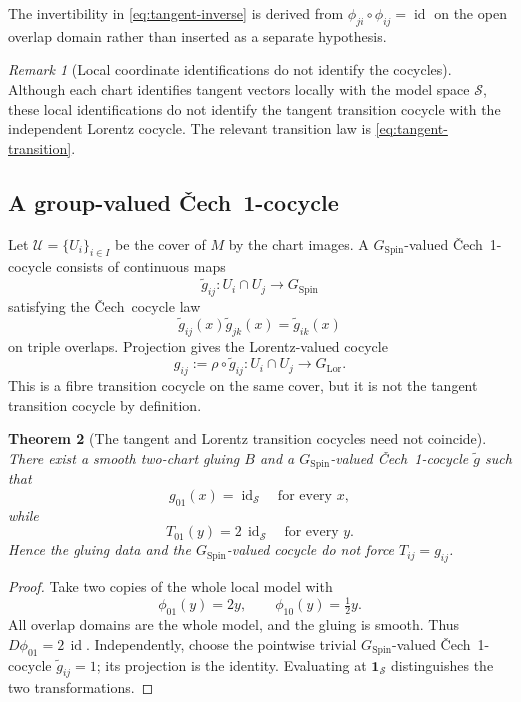 \documentclass[11pt,a4paper]{article}
\newtheorem{theorem}{Theorem}[section]
\theoremstyle{definition}
\theoremstyle{remark}
\newtheorem{remark}[theorem]{Remark}
\newcommand{\Smodel}{\mathcal{S}}
\newcommand{\SpinG}{G_{\mathrm{Spin}}}
\newcommand{\LorG}{G_{\mathrm{Lor}}}
\newcommand{\id}{\operatorname{id}}
\newcommand{\Cech}{\ifmmode\text{\v{C}ech}\else\v{C}ech\fi}
\newcommand{\cU}{\mathcal{U}}
\begin{document}
The invertibility in \eqref{eq:tangent-inverse} is derived from
\(\phi_{ji}\circ\phi_{ij}=\id\) on the open overlap domain rather than
inserted as a separate hypothesis.

\begin{remark}[Local coordinate identifications do not identify the cocycles]
Although each chart identifies tangent vectors locally with the model
space \(\Smodel\), these local identifications do not identify the tangent
transition cocycle with the independent Lorentz cocycle.  The relevant
transition law is \eqref{eq:tangent-transition}.
\end{remark}

\subsection{A group-valued \Cech\ 1-cocycle}

Let \(\cU=\{U_i\}_{i\in I}\) be the cover of \(M\) by the chart images.
A \(\SpinG\)-valued \Cech\ 1-cocycle consists of continuous maps
\[
   \widetilde g_{ij}:U_i\cap U_j\longrightarrow\SpinG
\tag{6.3}
\]
satisfying the \Cech\ cocycle law
\[
   \widetilde g_{ij}(x)\widetilde g_{jk}(x)
   =
   \widetilde g_{ik}(x)
\tag{6.4}
\]
on triple overlaps.  Projection gives the Lorentz-valued cocycle
\[
   g_{ij}:=\rho\circ\widetilde g_{ij}:
   U_i\cap U_j\longrightarrow\LorG.
\tag{6.5}
\]
This is a fibre transition cocycle on the same cover, but it is not the
tangent transition cocycle by definition.

\begin{theorem}[The tangent and Lorentz transition cocycles need not coincide]
\label{thm:transition-independence}
There exist a smooth two-chart gluing \(B\) and a \(\SpinG\)-valued \Cech\ 1-cocycle \(\widetilde g\) such that
\[
   g_{01}(x)=\id_{\Smodel}
   \quad\text{for every }x,
\tag{6.6}
\]
while
\[
   T_{01}(y)=2\,\id_{\Smodel}
   \quad\text{for every }y.
\tag{6.7}
\]
Hence the gluing data and the \(\SpinG\)-valued cocycle do not force
\(T_{ij}=g_{ij}\).
\end{theorem}

\begin{proof}
Take two copies of the whole local model with
\[
   \phi_{01}(y)=2y,\qquad
   \phi_{10}(y)=\tfrac12 y.
\]
All overlap domains are the whole model, and the gluing is smooth.
Thus \(D\phi_{01}=2\,\id\).  Independently, choose the pointwise trivial \(\SpinG\)-valued \Cech\ 1-cocycle \(\widetilde g_{ij}=1\); its projection is the identity.
Evaluating at \(\mathbf1_{\Smodel}\) distinguishes the two transformations.
\end{proof}
\end{document}
